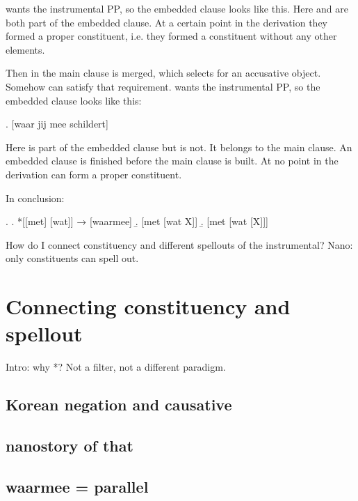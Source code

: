 \documentclass{article}
\begin{document}
 wants the instrumental PP, so the embedded clause looks like this. Here  and  are both part of the embedded clause. At a certain point in the derivation they formed a proper constituent, i.e. they formed a constituent without any other elements.




Then in the main clause  is merged, which selects for an accusative object. Somehow  can satisfy that requirement.  wants the instrumental PP, so the embedded clause looks like this:

\ex. [waar jij mee schildert]

Here  is part of the embedded clause but  is not. It belongs to the main clause. An embedded clause is finished before the main clause is built. At no point in the derivation can   form a proper constituent.



In conclusion:

\ex.
\a. *[[met] [wat]] → [waarmee]
\b. [met [wat X]]
\b. [met [wat [X]]]



How do I connect constituency and different spellouts of the instrumental? Nano: only constituents can spell out.






\section{Connecting constituency and spellout}

Intro: why *? Not a filter, not a different paradigm.


\subsection{Korean negation and causative}

\subsection{nanostory of that}

\subsection{waarmee = parallel}
\end{document}
